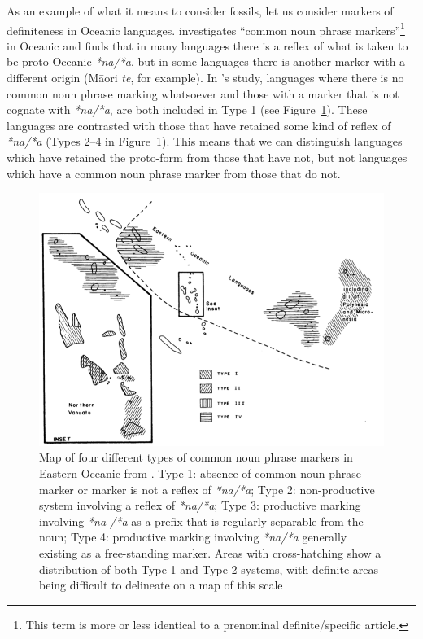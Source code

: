 \documentclass[12pt,letterpaper]{article}
\begin{document}
As an example of what it means to consider fossils, let us consider markers of definiteness in Oceanic languages. \citet{crowley1985common} investigates ``common noun phrase markers''\footnote{This term is more or less identical to a prenominal definite/specific article.} in Oceanic and finds that in many languages there is a reflex of what is taken to be proto-Oceanic \textit{*na/*a}, but in some languages there is another marker with a different origin (M\={a}ori \textit{te}, for example). In \citeauthor{crowley1985common}'s study, languages where there is no common noun phrase marking whatsoever and those with a marker that is not cognate with \textit{*na/*a}, are both included in Type 1 (see Figure~\ref{fig:crowley_map}). These languages are contrasted with those that have retained some kind of reflex of \emph{*na/*a} (Types 2--4 in Figure~\ref{fig:crowley_map}). This means that we can distinguish languages which have retained the proto-form from those that have not, but not languages which have a common noun phrase marker from those that do not.

\begin{figure}[!ht]
\centering
\includegraphics[width=15cm]{illustrations/crowley_1985_map.png}
\caption[Map of four different types of common noun phrase markers in Eastern Oceanic from Crowley(1985).]{Map of four different types of common noun phrase markers in Eastern Oceanic from \citet[162]{crowley1985common}. Type 1: absence of common noun phrase marker or marker is not a reflex of \textit{*na/*a}; Type 2: non-productive system involving a reflex of \textit{*na/*a}; Type 3: productive marking involving \emph{*na /*a} as a prefix that is regularly separable from the noun; Type 4: productive marking involving \textit{*na/*a} generally existing as a free-standing marker. Areas with cross-hatching show a distribution of both Type 1 and Type 2 systems, with definite areas being difficult to delineate on a map of this scale}
\label{fig:crowley_map}
\end{figure}
\end{document}
